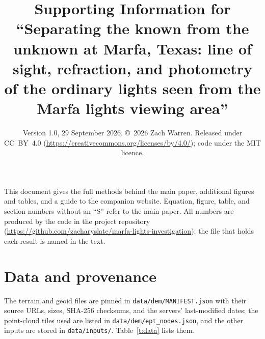 \documentclass[11pt]{article}
\title{Supporting Information for\\ ``Separating the known from the unknown at Marfa, Texas: line of sight, refraction, and photometry of the ordinary lights seen from the Marfa lights viewing area''}
\date{Version 1.0, 29 September 2026. \copyright~2026 Zach Warren. Released under CC~BY~4.0 (\url{https://creativecommons.org/licenses/by/4.0/}); code under the MIT licence.}
\newif\ifanonymous
\newcommand{\repo}{\ifanonymous[repository withheld for review]\else\url{https://github.com/zacharyslate/marfa-lights-investigation}\fi}
\begin{document}
\maketitle

This document gives the full methods behind the main paper, additional figures and tables, and a guide to the companion website. Equation, figure, table, and section numbers without an ``S'' refer to the main paper. All numbers are produced by the code in the project repository (\repo); the file that holds each result is named in the text.

\tableofcontents
\clearpage

\section{Data and provenance}\label{s:data}

The terrain and geoid files are pinned in \texttt{data/dem/MANIFEST.json} with their source URLs, sizes, SHA-256 checksums, and the servers' last-modified dates; the point-cloud tiles used are listed in \texttt{data/dem/ept\_nodes.json}, and the other inputs are stored in \texttt{data/inputs/}. Table~\ref{t:data} lists them.
\end{document}
